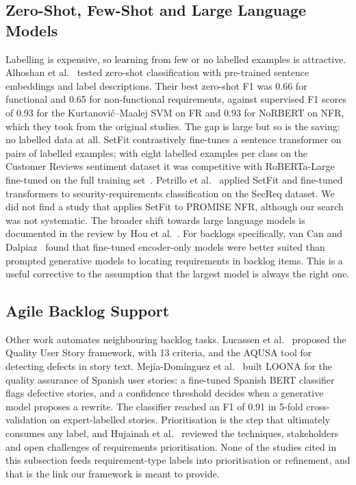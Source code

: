 \documentclass[conference,10pt,letterpaper]{IEEEtran}
\begin{document}
\subsection{Zero-Shot, Few-Shot and Large Language Models}
Labelling is expensive, so learning from few or no labelled examples is attractive. Alhoshan et al.~\cite{alhoshan2023} tested zero-shot classification with pre-trained sentence embeddings and label descriptions. Their best zero-shot F1 was 0.66 for functional and 0.65 for non-functional requirements, against supervised F1 scores of 0.93 for the Kurtanović–Maalej SVM on FR and 0.93 for NoRBERT on NFR, which they took from the original studies. The gap is large but so is the saving: no labelled data at all. SetFit contrastively fine-tunes a sentence transformer on pairs of labelled examples; with eight labelled examples per class on the Customer Reviews sentiment dataset it was competitive with RoBERTa-Large fine-tuned on the full training set~\cite{tunstall2022setfit}. Petrillo et al.~\cite{petrillo2025} applied SetFit and fine-tuned transformers to security-requirements classification on the SecReq dataset. We did not find a study that applies SetFit to PROMISE NFR, although our search was not systematic. The broader shift towards large language models is documented in the review by Hou et al.~\cite{hou2024llm4se}. For backlogs specifically, van Can and Dalpiaz~\cite{vancan2025} found that fine-tuned encoder-only models were better suited than prompted generative models to locating requirements in backlog items. This is a useful corrective to the assumption that the largest model is always the right one.

\subsection{Agile Backlog Support}
Other work automates neighbouring backlog tasks. Lucassen et al.~\cite{lucassen2016qus} proposed the Quality User Story framework, with 13 criteria, and the AQUSA tool for detecting defects in story text. Mejía-Domínguez et al.~\cite{mejia2026loona} built LOONA for the quality assurance of Spanish user stories: a fine-tuned Spanish BERT classifier flags defective stories, and a confidence threshold decides when a generative model proposes a rewrite. The classifier reached an F1 of 0.91 in 5-fold cross-validation on expert-labelled stories. Prioritisation is the step that ultimately consumes any label, and Hujainah et al.~\cite{hujainah2018} reviewed the techniques, stakeholders and open challenges of requirements prioritisation. None of the studies cited in this subsection feeds requirement-type labels into prioritisation or refinement, and that is the link our framework is meant to provide.
\end{document}
